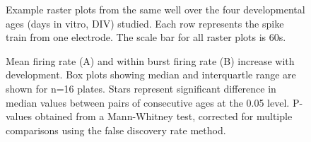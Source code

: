 \documentclass{article}\usepackage[]{graphicx}\usepackage[]{color}
\begin{document}
\onehalfspacing
\pagestyle{empty}


\makeatletter
\@fpsep\textheight
\makeatother




 
 
\begin{figure}
  \centering
  \caption{Example raster plots from the same well over the four
    developmental ages (days in vitro, DIV) studied. Each row
    represents the spike train from one electrode. The scale bar for
    all raster plots is 60s.}
\end{figure}

\begin{figure}
  \centering
  \caption{Mean firing rate (A) and within burst firing rate (B)
    increase with development.  Box plots showing median and
    interquartle range are shown for n=16 plates. Stars represent significant difference in median values between pairs of consecutive ages at the 0.05 level. P-values obtained from a Mann-Whitney test, corrected for multiple comparisons using the false discovery rate method.}
\end{figure}
\end{document}
